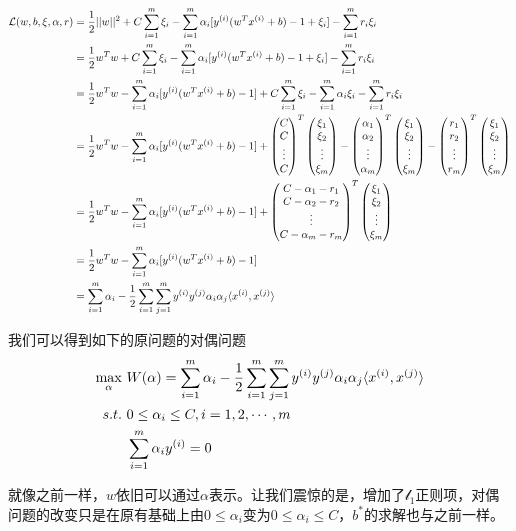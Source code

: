 \begin{eqnarray}
\begin{aligned}
\mathcal{L}(w,b,\xi,\alpha,r)&=\frac{1}{2}||w||^2+C\sum_{i=1}^m\xi_i-\sum_{i=1}^m\alpha_i[{y}^{({i})}(w^T{x}^{({i})}+b)-1+\xi_i]-\sum_{i=1}^mr_i\xi_i\\
&=\frac{1}{2}w^Tw+C\sum_{i=1}^m\xi_i-\sum_{i=1}^m\alpha_i[{y}^{({i})}(w^T{x}^{({i})}+b)-1+\xi_i]-\sum_{i=1}^mr_i\xi_i\\
&=\frac{1}{2}w^Tw-\sum_{i=1}^m\alpha_i[{y}^{({i})}(w^T{x}^{({i})}+b)-1]+C\sum_{i=1}^m\xi_i-\sum_{i=1}^m\alpha_i\xi_i-\sum_{i=1}^mr_i\xi_i\\
&=\frac{1}{2}w^Tw-\sum_{i=1}^m\alpha_i[{y}^{({i})}(w^T{x}^{({i})}+b)-1]+
\begin{pmatrix}
C\\
C\\
\vdots\\
C
\end{pmatrix}^T\begin{pmatrix} {\xi}_1\\ {\xi}_2\\ \vdots\\ {\xi}_{m} \end{pmatrix}-\begin{pmatrix} {\alpha}_1\\ {\alpha}_2\\ \vdots\\ {\alpha}_{m} \end{pmatrix}^T\begin{pmatrix} {\xi}_1\\ {\xi}_2\\ \vdots\\ {\xi}_{m} \end{pmatrix}-\begin{pmatrix} {r}_1\\ {r}_2\\ \vdots\\ {r}_{m} \end{pmatrix}^T\begin{pmatrix} {\xi}_1\\ {\xi}_2\\ \vdots\\ {\xi}_{m} \end{pmatrix}\\
&=\frac{1}{2}w^Tw-\sum_{i=1}^m\alpha_i[{y}^{({i})}(w^T{x}^{({i})}+b)-1]+
\begin{pmatrix}
C-\alpha_1-r_1\\
C-\alpha_2-r_2\\
\vdots\\
C-\alpha_m-r_m
\end{pmatrix}^T\begin{pmatrix} {\xi}_1\\ {\xi}_2\\ \vdots\\ {\xi}_{m} \end{pmatrix}\\
&=\frac{1}{2}w^Tw-\sum_{i=1}^m\alpha_i[{y}^{({i})}(w^T{x}^{({i})}+b)-1]\\
&=\sum_{i=1}^m\alpha_i-\frac{1}{2}\sum_{i=1}^m\sum_{j=1}^m{y}^{({i})}{y}^{({j})}\alpha_i\alpha_j\langle{x}^{({i})},{x}^{({j})}\rangle
\end{aligned}
\end{eqnarray}

我们可以得到如下的原问题的对偶问题
\begin{eqnarray}
\begin{aligned}
\max_\alpha&\ W(\alpha)=\sum_{i=1}^m\alpha_i-\frac{1}{2}\sum_{i=1}^m\sum_{j=1}^m\sample{y}{i}\sample{y}{j}\alpha_i\alpha_j\langle\sample{x}{i},\sample{x}{j}\rangle\\
s.t.&\ 0\leq \alpha_i \leq C,i=1,2,\cdots,m\\
&\ \sum_{i=1}^m\alpha_i\sample{y}{i}=0
\end{aligned}
\end{eqnarray}

就像之前一样，$w$依旧可以通过$\alpha$表示。让我们震惊的是，增加了$\mathcal{l}_1$正则项，对偶问题的改变只是在原有基础上由$0\leq\alpha_i$变为$0\leq\alpha_i\leq C$，$b^*$的求解也与之前一样。

